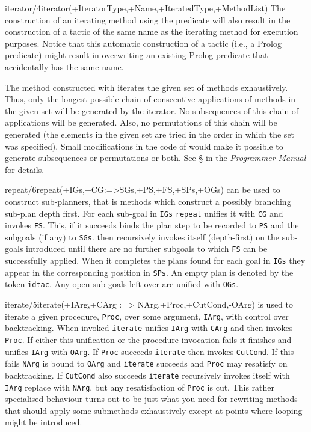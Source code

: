 \begin{predicate}{iterator/4}{iterator(+IteratorType,+Name,+IteratedType,+MethodList)}
The construction of an iterating method using the 
predicate will also result in the construction of a tactic of the same
name as the iterating method for execution purposes.
\notnice
Notice that this automatic construction of a tactic (i.e., a Prolog
predicate) might result in overwriting an existing Prolog predicate
that accidentally has the same name. 
\end{predicate}

The method constructed with  iterates the given set of
methods exhaustively. Thus, only the longest possible chain of
consecutive applications of methods in the given set will be generated
by the iterator. No subsequences of this chain of applications will be
generated. Also, no permutations of this chain will be generated (the
elements in the given set are tried in the order in which the set was
specified). Small modifications in the code of 
would make it possible to generate subsequences or permutations or
both. See \S{} in the {\em Programmer
Manual\/} for details.

\begin{predicate}{repeat/6}{repeat(+IGs,+CG:=>SGs,+PS,+FS,+SPs,+OGs)}%
 can be used to construct sub-planners, that is methods 
which construct a possibly branching sub-plan depth first. For each
sub-goal in {\tt IGs} {\tt repeat} unifies it with {\tt CG} and invokes 
{\tt FS}. This, if it succeeds binds the plan step to be recorded to 
{\tt PS} and the subgoals (if any) to {\tt SGs}.  then
recursively invokes itself (depth-first) on the sub-goals introduced
until there are no further subgoals to which {\tt FS} can be successfully 
applied. When it completes the plans found for each goal in {\tt IGs}
they appear in the corresponding position in {\tt SPs}. An empty
plan is denoted by the token {\tt idtac}. Any open sub-goals left
over are unified with {\tt OGs}.
\end{predicate}

\begin{predicate}{iterate/5}{iterate(+IArg,+CArg :=> NArg,+Proc,+CutCond,-OArg)}%
 is used to iterate a given procedure, {\tt Proc}, over some
argument, {\tt IArg}, with control over backtracking. When invoked {\tt iterate}
unifies {\tt IArg} with {\tt CArg} and then invokes {\tt Proc}. If either 
this unification or the procedure invocation fails it finishes and unifies 
{\tt IArg} with {\tt OArg}. If {\tt Proc} succeeds {\tt iterate} then
invokes {\tt CutCond}. If this fails {\tt NArg} is bound to {\tt OArg}
and {\tt iterate} succeeds and {\tt Proc} may resatisfy on backtracking.
If {\tt CutCond} also succeeds {\tt iterate} recursively invokes itself 
with {\tt IArg} replace with {\tt NArg}, but any resatisfaction
of {\tt Proc} is cut. This rather specialised behaviour turns out to be
just what you need for rewriting methods that should apply some submethods 
exhaustively except at points where looping might be introduced. 
\end{predicate}


